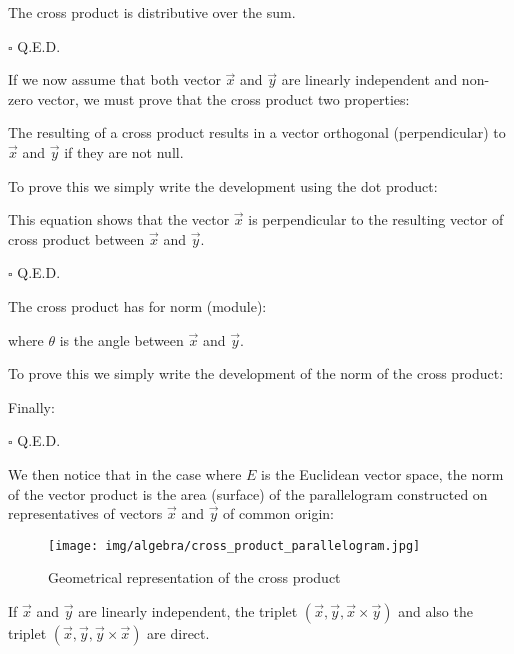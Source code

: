 	\begin{theorem}
	The cross product is distributive over the sum.
	\end{theorem}
	\begin{dem}
	
	\begin{flushright}
		$\square$  Q.E.D.
	\end{flushright}
	\end{dem}
	
	If we now assume that both vector $\vec{x}$ and $\vec{y}$ are linearly independent and non-zero vector, we must prove that the cross product two properties:
	\begin{theorem}
	The resulting of a cross product results in a vector orthogonal (perpendicular) to $\vec{x}$ and $\vec{y}$ if they are not null.
	\end{theorem}
	\begin{dem}
	To prove this we simply write the development using the dot product:
	
	This equation shows that the vector $\vec{x}$ is perpendicular to the resulting vector of cross product between $\vec{x}$ and $\vec{y}$.
	\begin{flushright}
		$\square$  Q.E.D.
	\end{flushright}
	\end{dem}
	\begin{theorem}
	The cross product has for norm (module):
	
	where $\theta$ is the angle between $\vec{x}$ and $\vec{y}$.
	\end{theorem}
	\begin{dem}
		To prove this we simply write the development of the norm of the cross product:
		
		Finally:
		
	\begin{flushright}
		$\square$  Q.E.D.
	\end{flushright}
	\end{dem}
	\label{cross product as surface parallelogram}We then notice that in the case where $E$ is the Euclidean vector space, the norm of the vector product is the area (surface) of the parallelogram constructed on representatives of vectors $\vec{x}$ and $\vec{y}$ of common origin:
	\begin{figure}[H]
		\centering
		\texttt{[image: img/algebra/cross\_product\_parallelogram.jpg]}
		\caption{Geometrical representation of the cross product}
	\end{figure}
	If $\vec{x}$ and $\vec{y}$ are linearly independent, the triplet $(\vec{x},\vec{y},\vec{x}\times \vec{y})$ and also the triplet $(\vec{x},\vec{y},\vec{y}\times \vec{x})$ are direct.
	
